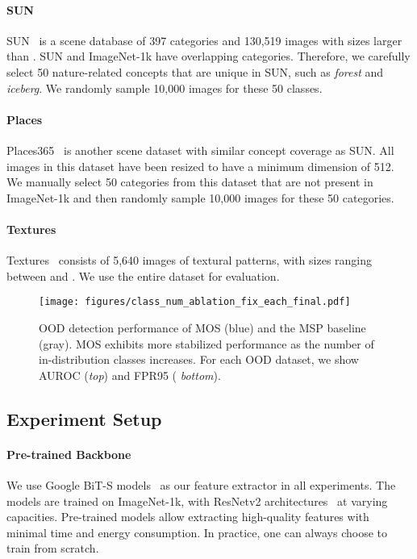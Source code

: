 \documentclass[final]{cvpr}
\begin{document}
\paragraph{SUN} SUN~\cite{xiao2010sun} is a scene database of 397 categories and 130,519 images with sizes larger than . 
SUN and ImageNet-1k have overlapping categories. Therefore, we carefully select 50 nature-related concepts that are unique in SUN,  such as \textit{forest} and \textit{iceberg}. We randomly sample 10,000 images for these 50 classes. 
\vspace{-0.4cm}
\paragraph{Places} Places365~\cite{zhou2017places} is another scene dataset with similar concept coverage as SUN. 
All images in this dataset have been resized to have a minimum dimension of 512. We manually select 50 categories from this dataset that are not present in ImageNet-1k and then randomly sample 10,000 images for these 50 categories.

\vspace{-0.5cm}
\paragraph{Textures}  Textures~\cite{cimpoi2014describing} consists of 5,640 images of textural patterns, with sizes ranging between  and . We use the entire dataset for evaluation. 




\begin{figure*}[t]
    \centering
    \vspace{-0.3cm}
    \texttt{[image: figures/class\_num\_ablation\_fix\_each\_final.pdf]}
    \caption{\small{OOD detection performance of MOS (blue) and the MSP baseline (gray). MOS exhibits more stabilized performance as the number of in-distribution classes increases. For each OOD dataset, we show AUROC (\textit{top}) and FPR95 ( \textit{bottom}).}}
    \label{fig:exp_class_num_ablation_fix_each}
    \vspace{-0.3cm}
\end{figure*}

\subsection{Experiment Setup}
\label{sec:exp_setup}
\vspace{-0.1cm}
\paragraph{Pre-trained Backbone} We use Google BiT-S models~\cite{kolesnikov2020big} as our feature extractor in all experiments. The models are trained on ImageNet-1k, with ResNetv2 architectures~\cite{he2016identity} at varying capacities.
Pre-trained models allow extracting high-quality features with minimal time and energy consumption. In practice, one can always choose to train from scratch.
\end{document}
